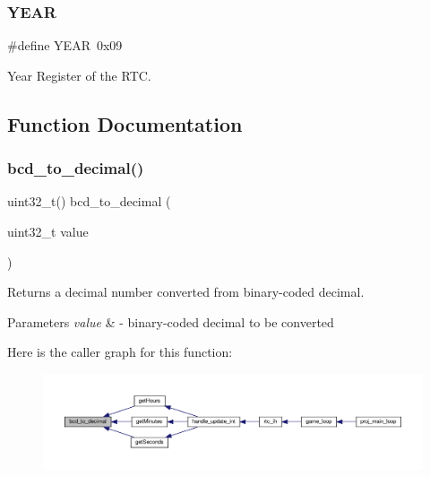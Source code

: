 \subsubsection{\texorpdfstring{Y\+E\+AR}{YEAR}}
{\footnotesize\ttfamily \#define Y\+E\+AR~0x09}



Year Register of the R\+TC. 



\subsection{Function Documentation}
\mbox{\label{group__rtc_ga11fd18e1bdb318485926015c12a8ef15}} 
\subsubsection{\texorpdfstring{bcd\+\_\+to\+\_\+decimal()}{bcd\_to\_decimal()}}
{\footnotesize\ttfamily uint32\+\_\+t() bcd\+\_\+to\+\_\+decimal (\begin{DoxyParamCaption}\item[{uint32\+\_\+t}]{value }\end{DoxyParamCaption})}



Returns a decimal number converted from binary-\/coded decimal. 


\begin{DoxyParams}{Parameters}
{\em value} & -\/ binary-\/coded decimal to be converted \\
\hline
\end{DoxyParams}
Here is the caller graph for this function\+:
\nopagebreak
\begin{figure}[H]
\begin{center}
\leavevmode
\includegraphics[width=350pt]{group__rtc_ga11fd18e1bdb318485926015c12a8ef15_icgraph}
\end{center}
\end{figure}
\mbox{\label{group__rtc_ga2e0029ef8fd7e11a5189b0bc4634a2c7}} 
